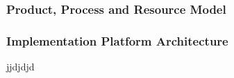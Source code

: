 \subsubsection{Product, Process and Resource Model}
\subsubsection{Implementation Platform Architecture}
jjdjdjd
